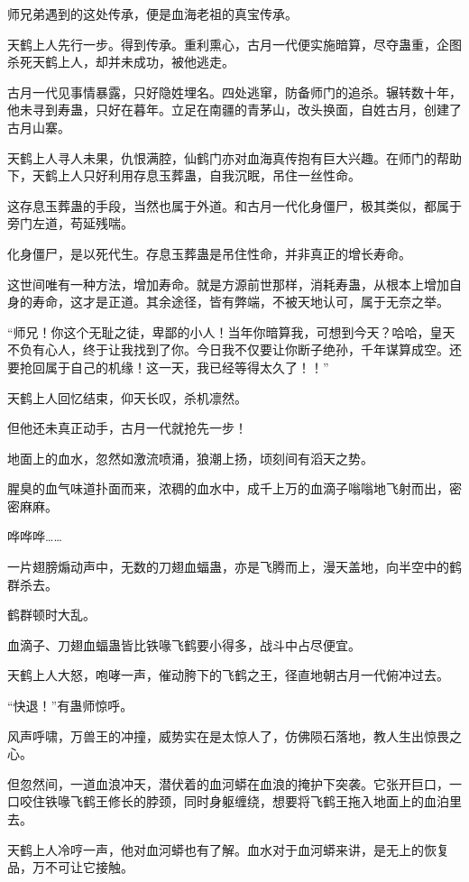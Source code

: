 \begin{this_body}
师兄弟遇到的这处传承，便是血海老祖的真宝传承。

天鹤上人先行一步。得到传承。重利熏心，古月一代便实施暗算，尽夺蛊重，企图杀死天鹤上人，却并未成功，被他逃走。

古月一代见事情暴露，只好隐姓埋名。四处逃窜，防备师门的追杀。辗转数十年，他未寻到寿蛊，只好在暮年。立足在南疆的青茅山，改头换面，自姓古月，创建了古月山寨。

天鹤上人寻人未果，仇恨满腔，仙鹤门亦对血海真传抱有巨大兴趣。在师门的帮助下，天鹤上人只好利用存息玉葬蛊，自我沉眠，吊住一丝性命。

这存息玉葬蛊的手段，当然也属于外道。和古月一代化身僵尸，极其类似，都属于旁门左道，苟延残喘。

化身僵尸，是以死代生。存息玉葬蛊是吊住性命，并非真正的增长寿命。

这世间唯有一种方法，增加寿命。就是方源前世那样，消耗寿蛊，从根本上增加自身的寿命，这才是正道。其余途径，皆有弊端，不被天地认可，属于无奈之举。

“师兄！你这个无耻之徒，卑鄙的小人！当年你暗算我，可想到今天？哈哈，皇天不负有心人，终于让我找到了你。今日我不仅要让你断子绝孙，千年谋算成空。还要抢回属于自己的机缘！这一天，我已经等得太久了！！”

天鹤上人回忆结束，仰天长叹，杀机凛然。

但他还未真正动手，古月一代就抢先一步！

地面上的血水，忽然如激流喷涌，狼潮上扬，顷刻间有滔天之势。

腥臭的血气味道扑面而来，浓稠的血水中，成千上万的血滴子嗡嗡地飞射而出，密密麻麻。

哗哗哗……

一片翅膀煽动声中，无数的刀翅血蝠蛊，亦是飞腾而上，漫天盖地，向半空中的鹤群杀去。

鹤群顿时大乱。

血滴子、刀翅血蝠蛊皆比铁喙飞鹤要小得多，战斗中占尽便宜。

天鹤上人大怒，咆哮一声，催动胯下的飞鹤之王，径直地朝古月一代俯冲过去。

“快退！”有蛊师惊呼。

风声呼啸，万兽王的冲撞，威势实在是太惊人了，仿佛陨石落地，教人生出惊畏之心。

但忽然间，一道血浪冲天，潜伏着的血河蟒在血浪的掩护下突袭。它张开巨口，一口咬住铁喙飞鹤王修长的脖颈，同时身躯缠绕，想要将飞鹤王拖入地面上的血泊里去。

天鹤上人冷哼一声，他对血河蟒也有了解。血水对于血河蟒来讲，是无上的恢复品，万不可让它接触。


\end{this_body}
